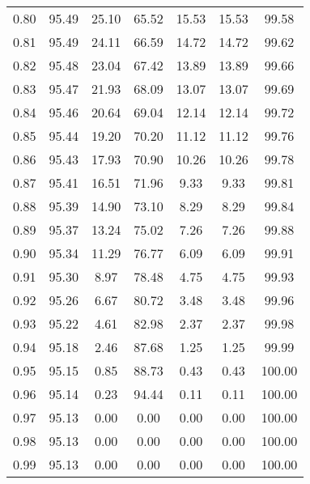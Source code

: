 \begin{tabular}{|c|c|c|c|c|c|c|}
      0.80 &     95.49 &     25.10 &      65.52 &   15.53 &      15.53 &         99.58 \\
      0.81 &     95.49 &     24.11 &      66.59 &   14.72 &      14.72 &         99.62 \\
      0.82 &     95.48 &     23.04 &      67.42 &   13.89 &      13.89 &         99.66 \\
      0.83 &     95.47 &     21.93 &      68.09 &   13.07 &      13.07 &         99.69 \\
      0.84 &     95.46 &     20.64 &      69.04 &   12.14 &      12.14 &         99.72 \\
      0.85 &     95.44 &     19.20 &      70.20 &   11.12 &      11.12 &         99.76 \\
      0.86 &     95.43 &     17.93 &      70.90 &   10.26 &      10.26 &         99.78 \\
      0.87 &     95.41 &     16.51 &      71.96 &    9.33 &       9.33 &         99.81 \\
      0.88 &     95.39 &     14.90 &      73.10 &    8.29 &       8.29 &         99.84 \\
      0.89 &     95.37 &     13.24 &      75.02 &    7.26 &       7.26 &         99.88 \\
      0.90 &     95.34 &     11.29 &      76.77 &    6.09 &       6.09 &         99.91 \\
      0.91 &     95.30 &      8.97 &      78.48 &    4.75 &       4.75 &         99.93 \\
      0.92 &     95.26 &      6.67 &      80.72 &    3.48 &       3.48 &         99.96 \\
      0.93 &     95.22 &      4.61 &      82.98 &    2.37 &       2.37 &         99.98 \\
      0.94 &     95.18 &      2.46 &      87.68 &    1.25 &       1.25 &         99.99 \\
      0.95 &     95.15 &      0.85 &      88.73 &    0.43 &       0.43 &        100.00 \\
      0.96 &     95.14 &      0.23 &      94.44 &    0.11 &       0.11 &        100.00 \\
      0.97 &     95.13 &      0.00 &       0.00 &    0.00 &       0.00 &        100.00 \\
      0.98 &     95.13 &      0.00 &       0.00 &    0.00 &       0.00 &        100.00 \\
      0.99 &     95.13 &      0.00 &       0.00 &    0.00 &       0.00 &        100.00 \\
\bottomrule
\end{tabular}

